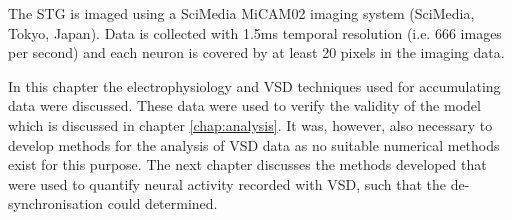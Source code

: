 The \ac{STG} is imaged using a SciMedia MiCAM02 imaging system (SciMedia, Tokyo, Japan). Data is collected with 1.5ms temporal resolution (i.e. 666 images per second) and each neuron is covered by at least 20 pixels in the imaging data.

In this chapter the electrophysiology and \ac{VSD} techniques used for accumulating data were discussed. These data were used to verify the validity of the model which is discussed in chapter \ref{chap:analysis}. It was, however, also necessary to develop methods for the analysis of \ac{VSD} data as no suitable numerical methods exist for this purpose. The next chapter discusses the methods developed that were used to quantify neural activity recorded with \ac{VSD}, such that the de-synchronisation could determined.